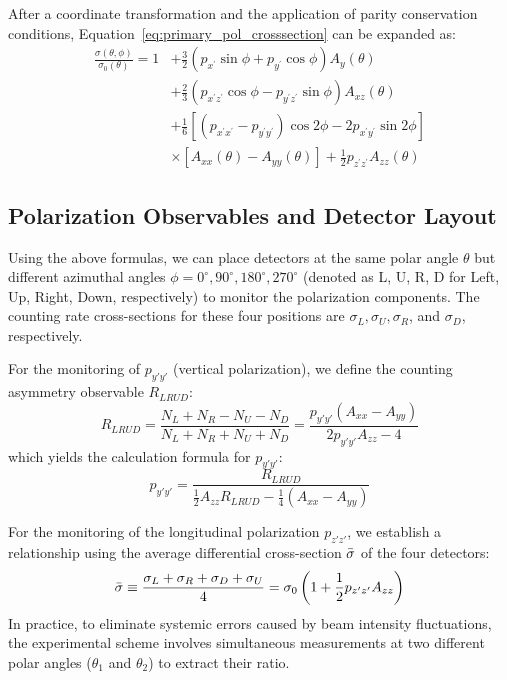 \documentclass[11pt,a4paper]{article}
\begin{document}
After a coordinate transformation and the application of parity conservation conditions, Equation~\ref{eq:primary_pol_crosssection} can be expanded as:
\begin{equation}
\label{eq:polar_crosssection}
\begin{aligned}
    \frac{\sigma(\theta, \phi)}{\sigma_0(\theta)}=1 & +\frac{3}{2}\left(p_{x^{\prime}} \sin \phi+p_{y^{\prime}} \cos \phi\right) A_y(\theta) \\
    &+\frac{2}{3}\left(p_{x^{\prime} z^{\prime}} \cos \phi-p_{y^{\prime} z^{\prime}} \sin \phi\right) A_{x z}(\theta)  \\
    &+\frac{1}{6}\left[\left(p_{x^{\prime} x^{\prime}}-p_{y^{\prime} y^{\prime}}\right) \cos 2 \phi-2 p_{x^{\prime} y^{\prime}} \sin 2 \phi\right] \\
    &\times\left[A_{x x}(\theta)-A_{yy}(\theta)\right] +\frac{1}{2} p_{z^{\prime} z^{\prime}} A_{z z}(\theta) 
\end{aligned}
\end{equation}

\subsection{Polarization Observables and Detector Layout}

Using the above formulas, we can place detectors at the same polar angle $\theta$ but different azimuthal angles $\phi=0^\circ, 90^\circ, 180^\circ, 270^\circ$ (denoted as L, U, R, D for Left, Up, Right, Down, respectively) to monitor the polarization components. The counting rate cross-sections for these four positions are $\sigma_L, \sigma_U, \sigma_R$, and $\sigma_D$, respectively.

For the monitoring of $p_{y'y'}$ (vertical polarization), we define the counting asymmetry observable $R_{LRUD}$:
\begin{equation}
     R_{LRUD} = \frac{N_L+N_R-N_U-N_D}{N_L+N_R+N_U+N_D}= \frac{p_{y'y'}(A_{xx}-A_{yy})}{2p_{y'y'}A_{zz}-4}
\end{equation}
which yields the calculation formula for $p_{y'y'}$:
\begin{equation}
     p_{y'y'} = \frac{R_{LRUD}}{\frac{1}{2} A_{zz} R_{LRUD}-\frac{1}{4}(A_{xx}-A_{yy})}
\label{eq:pyy_observable}
\end{equation}

For the monitoring of the longitudinal polarization $p_{z'z'}$, we establish a relationship using the average differential cross-section $\Bar{\sigma}$ of the four detectors:
\begin{equation}
   \Bar{\sigma}  \equiv \frac{\sigma_L+\sigma_R+\sigma_D+\sigma_U}{4} = \sigma_0 \left(1+\frac{1}{2}p_{z'z'}A_{zz}\right)
\label{eq:pzz_average_detector}
\end{equation}
In practice, to eliminate systemic errors caused by beam intensity fluctuations, the experimental scheme involves simultaneous measurements at two different polar angles ($\theta_1$ and $\theta_2$) to extract their ratio.
\end{document}
